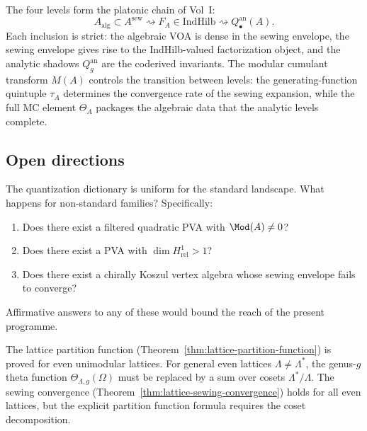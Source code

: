 \begin{remark}
The four levels form the platonic chain of
Vol~I:
\[
A_{\mathrm{alg}} \subset A^{\mathrm{sew}}
\rightsquigarrow F_A \in \mathrm{IndHilb}
\rightsquigarrow Q_\bullet^{\mathrm{an}}(A).
\]
Each inclusion is strict: the algebraic VOA is dense in the sewing
envelope, the sewing envelope gives rise to the IndHilb-valued
factorization object, and the analytic shadows $Q_g^{\mathrm{an}}$
are the coderived invariants. The modular cumulant transform $M(A)$
controls the transition between levels: the generating-function
quintuple $\tau_A$ determines the convergence rate of the sewing
expansion, while the full MC element $\Theta_A$ packages the
algebraic data that the analytic levels complete.
\end{remark}

\subsection{Open directions}

\begin{question}
The quantization dictionary is uniform for the standard landscape.
What happens for non-standard families? Specifically:
\begin{enumerate}[leftmargin=2.4em]
\item Does there exist a filtered quadratic PVA with
$\Mod(A) \neq 0$?

\item Does there exist a PVA with $\dim H^1_{\mathrm{rel}} > 1$?

\item Does there exist a chirally Koszul vertex algebra whose
sewing envelope fails to converge?
\end{enumerate}
Affirmative answers to any of these would bound the reach of the
present programme.
\end{question}

\begin{question}
The lattice partition function (Theorem~\ref{thm:lattice-partition-function})
is proved for even unimodular lattices. For general even lattices
$\Lambda \neq \Lambda^*$, the genus-$g$ theta function
$\Theta_{\Lambda,g}(\Omega)$ must be replaced by a sum over cosets
$\Lambda^*/\Lambda$. The sewing convergence
(Theorem~\ref{thm:lattice-sewing-convergence}) holds for all even lattices,
but the explicit partition function formula requires the coset
decomposition.
\end{question}

